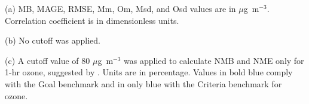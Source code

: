 \begin{table}
\begin{threeparttable}[b]
\begin{tabular}{lrrrrrrrrrr}
\bottomrule
\end{tabular}
\begin{tablenotes}
{\scriptsize
	\item[(a)] MB, MAGE, RMSE, Mm, Om, Msd, and Osd values are in $\mu$g~m$^{-3}$. Correlation coefficient is in dimensionless units.
	\item[(b)] No cutoff was applied.
	\item[(c)] A cutoff value of 80 $\mu$g~m$^{-3}$ was applied to calculate NMB and NME only for 1-hr ozone, suggested by \citet{Emery2017}. Units are in percentage. Values in bold blue comply with the Goal benchmark and in only blue with the Criteria benchmark for ozone.}
\end{tablenotes}
\end{threeparttable}
\end{table}